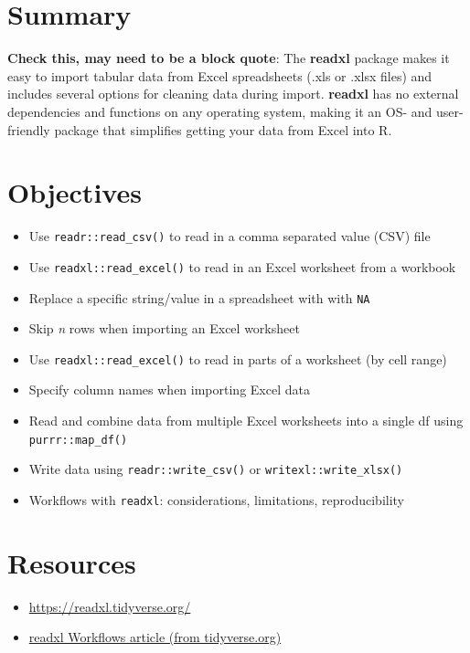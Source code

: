 \documentclass[]{book}
\providecommand{\tightlist}{%
  \setlength{\itemsep}{0pt}\setlength{\parskip}{0pt}}
\begin{document}
\hypertarget{summary-2}{%
\section{Summary}\label{summary-2}}

\textbf{Check this, may need to be a block quote}: The \textbf{readxl} package makes it easy to import tabular data from Excel spreadsheets (.xls or .xlsx files) and includes several options for cleaning data during import. \textbf{readxl} has no external dependencies and functions on any operating system, making it an OS- and user-friendly package that simplifies getting your data from Excel into R.

\hypertarget{objectives}{%
\section{Objectives}\label{objectives}}

\begin{itemize}
\tightlist
\item
  Use \texttt{readr::read\_csv()} to read in a comma separated value (CSV) file
\item
  Use \texttt{readxl::read\_excel()} to read in an Excel worksheet from a workbook
\item
  Replace a specific string/value in a spreadsheet with with \texttt{NA}
\item
  Skip \emph{n} rows when importing an Excel worksheet
\item
  Use \texttt{readxl::read\_excel()} to read in parts of a worksheet (by cell range)
\item
  Specify column names when importing Excel data
\item
  Read and combine data from multiple Excel worksheets into a single df using \texttt{purrr::map\_df()}
\item
  Write data using \texttt{readr::write\_csv()} or \texttt{writexl::write\_xlsx()}
\item
  Workflows with \texttt{readxl}: considerations, limitations, reproducibility
\end{itemize}

\hypertarget{resources-2}{%
\section{Resources}\label{resources-2}}

\begin{itemize}
\tightlist
\item
  \url{https://readxl.tidyverse.org/}
\item
  \href{https://readxl.tidyverse.org/articles/articles/readxl-workflows.html}{readxl Workflows article (from tidyverse.org)}
\end{itemize}
\end{document}
